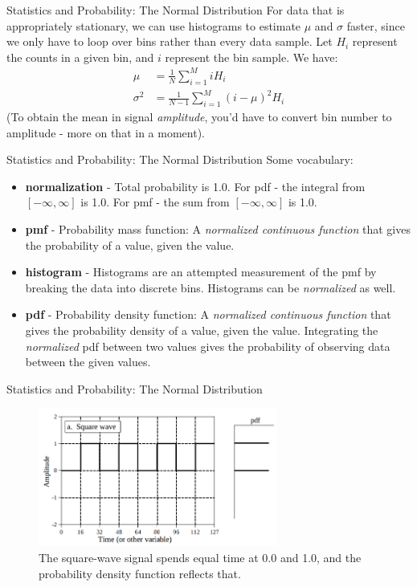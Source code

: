 \documentclass{beamer}
\begin{document}
\begin{frame}[fragile]{Statistics and Probability: The Normal Distribution}
\small
For data that is appropriately stationary, we can use histograms to estimate $\mu$ and $\sigma$ faster, since we only have to loop over bins rather than every data sample.  Let $H_i$ represent the counts in a given bin, and $i$ represent the bin sample.  We have:
\begin{align}
\mu &= \frac{1}{N}\sum_{i=1}^{M}i H_i \\
\sigma^{2} &= \frac{1}{N-1}\sum_{i=1}^M \left(i-\mu\right)^2 H_i
\end{align}
(To obtain the mean in signal \textit{amplitude}, you'd have to convert bin number to amplitude - more on that in a moment).
\end{frame}

\begin{frame}[fragile]{Statistics and Probability: The Normal Distribution}
\small
Some vocabulary:
\begin{itemize}
\item \textbf{normalization} - Total probability is 1.0.  For pdf - the integral from $[-\infty,\infty]$ is 1.0.  For pmf - the sum from $[-\infty,\infty]$ is 1.0.
\item \textbf{pmf} - Probability mass function: A \textit{normalized continuous function} that gives the probability of a value, given the value.
\item \textbf{histogram} - Histograms are an attempted measurement of the pmf by breaking the data into discrete bins.  Histograms can be \textit{normalized} as well.
\item \textbf{pdf} - Probability density function: A \textit{normalized continuous function} that gives the probability density of a value, given the value.  Integrating the \textit{normalized} pdf between two values gives the probability of observing data between the given values.
\end{itemize}
\end{frame}

\begin{frame}[fragile]{Statistics and Probability: The Normal Distribution}
\begin{figure}
\centering
\includegraphics[width=0.7\textwidth]{figures/squarepdf.png}
\caption{\label{fig:squarepdf} The square-wave signal spends equal time at 0.0 and 1.0, and the probability density function reflects that.}
\end{figure}
\end{frame}
\end{document}
